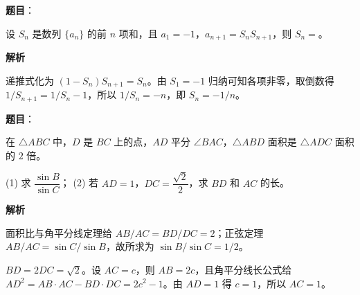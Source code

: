 \begin{answer}

\textbf{题目}：

设 $S_n$ 是数列 $\{a_n\}$ 的前 $n$ 项和，且 $a_1=-1$，$a_{n+1}=S_nS_{n+1}$，则 $S_n=$\gkblank{}。

\textbf{解析}

递推式化为 $(1-S_n)S_{n+1}=S_n$。由 $S_1=-1$ 归纳可知各项非零，取倒数得 $1/S_{n+1}=1/S_n-1$，所以 $1/S_n=-n$，即 $S_n=-1/n$。


\end{answer}
\begin{answer}

\textbf{题目}：

在 $\triangle ABC$ 中，$D$ 是 $BC$ 上的点，$AD$ 平分 $\angle BAC$，$\triangle ABD$ 面积是 $\triangle ADC$ 面积的 $2$ 倍。

(1) 求 $\dfrac{\sin B}{\sin C}$；  
(2) 若 $AD=1$，$DC=\dfrac{\sqrt2}{2}$，求 $BD$ 和 $AC$ 的长。

\textbf{解析}


面积比与角平分线定理给 $AB/AC=BD/DC=2$；正弦定理 $AB/AC=\sin C/\sin B$，故所求为 $\sin B/\sin C=1/2$。


$BD=2DC=\sqrt2$。设 $AC=c$，则 $AB=2c$，且角平分线长公式给 $AD^2=AB\cdot AC-BD\cdot DC=2c^2-1$。由 $AD=1$ 得 $c=1$，所以 $AC=1$。



\end{answer}
